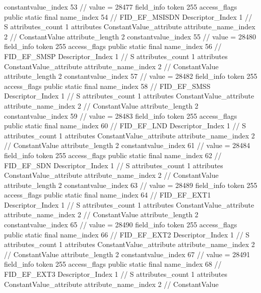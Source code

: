 {{{{{{{					constantvalue_index	53		// value = 28477
				}
				}
			}
			field_info {
				token	255
				access_flags	public static final
				name_index	54		// FID_EF_MSISDN
				Descriptor_Index	1		// S
				attributes_count	1
				attributes {
				ConstantValue_attribute {
					attribute_name_index	2		// ConstantValue
					attribute_length	2
					constantvalue_index	55		// value = 28480
				}
				}
			}
			field_info {
				token	255
				access_flags	public static final
				name_index	56		// FID_EF_SMSP
				Descriptor_Index	1		// S
				attributes_count	1
				attributes {
				ConstantValue_attribute {
					attribute_name_index	2		// ConstantValue
					attribute_length	2
					constantvalue_index	57		// value = 28482
				}
				}
			}
			field_info {
				token	255
				access_flags	public static final
				name_index	58		// FID_EF_SMSS
				Descriptor_Index	1		// S
				attributes_count	1
				attributes {
				ConstantValue_attribute {
					attribute_name_index	2		// ConstantValue
					attribute_length	2
					constantvalue_index	59		// value = 28483
				}
				}
			}
			field_info {
				token	255
				access_flags	public static final
				name_index	60		// FID_EF_LND
				Descriptor_Index	1		// S
				attributes_count	1
				attributes {
				ConstantValue_attribute {
					attribute_name_index	2		// ConstantValue
					attribute_length	2
					constantvalue_index	61		// value = 28484
				}
				}
			}
			field_info {
				token	255
				access_flags	public static final
				name_index	62		// FID_EF_SDN
				Descriptor_Index	1		// S
				attributes_count	1
				attributes {
				ConstantValue_attribute {
					attribute_name_index	2		// ConstantValue
					attribute_length	2
					constantvalue_index	63		// value = 28489
				}
				}
			}
			field_info {
				token	255
				access_flags	public static final
				name_index	64		// FID_EF_EXT1
				Descriptor_Index	1		// S
				attributes_count	1
				attributes {
				ConstantValue_attribute {
					attribute_name_index	2		// ConstantValue
					attribute_length	2
					constantvalue_index	65		// value = 28490
				}
				}
			}
			field_info {
				token	255
				access_flags	public static final
				name_index	66		// FID_EF_EXT2
				Descriptor_Index	1		// S
				attributes_count	1
				attributes {
				ConstantValue_attribute {
					attribute_name_index	2		// ConstantValue
					attribute_length	2
					constantvalue_index	67		// value = 28491
				}
				}
			}
			field_info {
				token	255
				access_flags	public static final
				name_index	68		// FID_EF_EXT3
				Descriptor_Index	1		// S
				attributes_count	1
				attributes {
				ConstantValue_attribute {
					attribute_name_index	2		// ConstantValue
}}}}}}}
